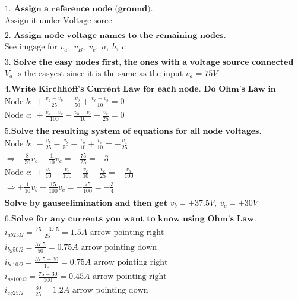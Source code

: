 \documentclass{article}
\begin{document}
\begin{align*}
  &\quad 1. \textbf{ Assign a reference node (ground).} \\
  &\quad \text{Assign it under Voltage sorce} \\
  &\quad \\
  &\quad 2. \textbf{ Assign node voltage names to the remaining nodes.} \\
  &\quad \text{See imgage for } v_a, \; v_B, \; v_c, \; a, \; b, \; c  \\
  &\quad \\
  &\quad 3. \textbf{ Solve the easy nodes first, the ones with a voltage source connected to the reference node.} \\
  &\quad V_a \text{ is the easyest since it is the same as the input } v_a=75V \\
  &\quad \\
  &\quad 4. \textbf{Write Kirchhoff's Current Law for each node. Do Ohm's Law in your head.} \\
  &\quad \text{Node $b$: } +\frac{v_a-v_b}{25} -\frac{v_b}{50} +\frac{v_c-v_b}{10} = 0 \\
  &\quad \text{Node $c$: } +\frac{v_a-v_c}{100} -\frac{v_b-v_c}{10} +\frac{v_c}{25} = 0 \\
  &\quad \\
  &\quad 5. \textbf{Solve the resulting system of equations for all node voltages.} \\
  &\quad \text{Node $b$: } -\frac{v_b}{25} -\frac{v_b}{50} -\frac{v_b}{10} +\frac{v_c}{10} = -\frac{v_a}{25} \\
  &\quad \Rightarrow -\frac{8}{50}v_b +\frac{1}{10}v_c = -\frac{75}{25} = -3 \\
  &\quad \text{Node $c$: } +\frac{v_b}{10} -\frac{v_c}{100} -\frac{v_c}{10} +\frac{v_c}{25} = -\frac{v_a}{100} \\
  &\quad \Rightarrow +\frac{1}{10}v_b -\frac{15}{100}v_c = -\frac{75}{100} = -\frac{3}{4} \\
  &\quad \\
  &\quad \textbf{Solve by gauseelimination and then get } v_b=+37.5V, \: v_c=+30V \\
  &\quad \\
  &\quad 6. \textbf{Solve for any currents you want to know using Ohm's Law.} \\
  &\quad i_{ab25\Omega} = \frac{75-37.5}{25} = 1.5A  \text{ arrow pointing right} \\
  &\quad i_{bg50\Omega} = \frac{37.5}{50} = 0.75A    \text{ arrow pointing down} \\
  &\quad i_{bc10\Omega} = \frac{37.5-30}{10} = 0.75A \text{ arrow pointing right} \\
  &\quad i_{ac100\Omega} = \frac{75-30}{100} = 0.45A \text{ arrow pointing right} \\
  &\quad i_{cg25\Omega} = \frac{30}{25} = 1.2A       \text{ arrow pointing down} \\
  &\quad \\
\end{align*}
\end{document}
